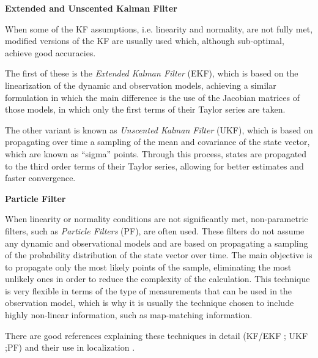 \begin{description}
	\item \textbf{Extended and Unscented Kalman Filter}	
	
	When some of the KF assumptions, i.e. linearity and normality, are not fully met, modified versions of the KF are usually used which, although sub-optimal, achieve good accuracies.
	
	The first of these is the \emph{Extended Kalman Filter} (EKF), which is based on the linearization of the dynamic and observation models, achieving a similar formulation in which the main difference is the use of the Jacobian matrices of those models, in which only the first terms of their Taylor series are taken.
	
	The other variant is known as \emph{Unscented Kalman Filter} (UKF), which is based on propagating over time a sampling of the mean and covariance of the state vector, which are known as ``sigma'' points. Through this process, states are propagated to the third order terms of their Taylor series, allowing for better estimates and faster convergence.	
	\item \textbf{Particle Filter}
		
	When linearity or normality conditions are not significantly met, non-pa\-ram\-e\-tric filters, such as \emph{Particle Filters} (PF), are often used.
	These filters do not assume any dynamic and observational models and are based on propagating a sampling of the probability distribution of the state vector over time.
	The main objective is to propagate only the most likely points of the sample, eliminating the most unlikely ones in order to reduce the complexity of the calculation.
	This technique is very flexible in terms of the type of measurements that can be used in the observation model, which is why it is usually the technique chosen to include highly non-linear information, such as map-matching information.	
	
\end{description}
There are good references explaining these techniques in detail (KF/EKF \cite{kalman_new_1960,bishop_introduction_2001}; UKF \cite{julier_new_1997};PF\cite{arnaud_tutorial_2008}) and their use in localization \cite{fox_bayesian_2003, seco_survey_2009}.
